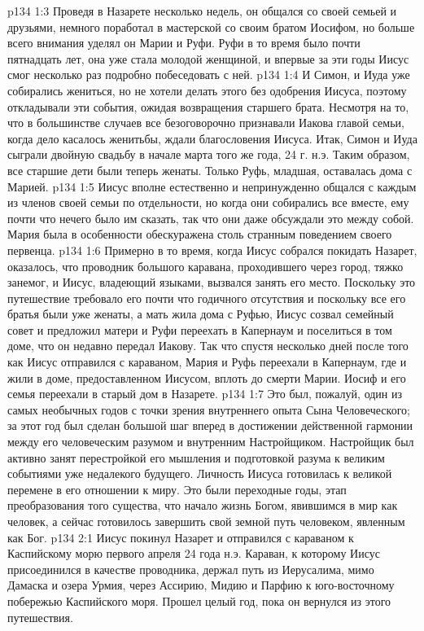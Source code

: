 \vs p134 1:3 Проведя в Назарете несколько недель, он общался со своей семьей и друзьями, немного поработал в мастерской со своим братом Иосифом, но больше всего внимания уделял он Марии и Руфи. Руфи в то время было почти пятнадцать лет, она уже стала молодой женщиной, и впервые за эти годы Иисус смог несколько раз подробно побеседовать с ней.
\vs p134 1:4 И Симон, и Иуда уже собирались жениться, но не хотели делать этого без одобрения Иисуса, поэтому откладывали эти события, ожидая возвращения старшего брата. Несмотря на то, что в большинстве случаев все безоговорочно признавали Иакова главой семьи, когда дело касалось женитьбы, ждали благословения Иисуса. Итак, Симон и Иуда сыграли двойную свадьбу в начале марта того же года, 24 г. н.э. Таким образом, все старшие дети были теперь женаты. Только Руфь, младшая, оставалась дома с Марией.
\vs p134 1:5 Иисус вполне естественно и непринужденно общался с каждым из членов своей семьи по отдельности, но когда они собирались все вместе, ему почти что нечего было им сказать, так что они даже обсуждали это между собой. Мария была в особенности обескуражена столь странным поведением своего первенца.
\vs p134 1:6 Примерно в то время, когда Иисус собрался покидать Назарет, оказалось, что проводник большого каравана, проходившего через город, тяжко занемог, и Иисус, владеющий языками, вызвался занять его место. Поскольку это путешествие требовало его почти что годичного отсутствия и поскольку все его братья были уже женаты, а мать жила дома с Руфью, Иисус созвал семейный совет и предложил матери и Руфи переехать в Капернаум и поселиться в том доме, что он недавно передал Иакову. Так что спустя несколько дней после того как Иисус отправился с караваном, Мария и Руфь переехали в Капернаум, где и жили в доме, предоставленном Иисусом, вплоть до смерти Марии. Иосиф и его семья переехали в старый дом в Назарете.
\vs p134 1:7 Это был, пожалуй, один из самых необычных годов с точки зрения внутреннего опыта Сына Человеческого; за этот год был сделан большой шаг вперед в достижении действенной гармонии между его человеческим разумом и внутренним Настройщиком. Настройщик был активно занят перестройкой его мышления и подготовкой разума к великим событиями уже недалекого будущего. Личность Иисуса готовилась к великой перемене в его отношении к миру. Это были переходные годы, этап преобразования того существа, что начало жизнь Богом, явившимся в мир как человек, а сейчас готовилось завершить свой земной путь человеком, явленным как Бог.
\vs p134 2:1 Иисус покинул Назарет и отправился с караваном к Каспийскому морю первого апреля 24 года н.э. Караван, к которому Иисус присоединился в качестве проводника, держал путь из Иерусалима, мимо Дамаска и озера Урмия, через Ассирию, Мидию и Парфию к юго\hyp{}восточному побережью Каспийского моря. Прошел целый год, пока он вернулся из этого путешествия.
